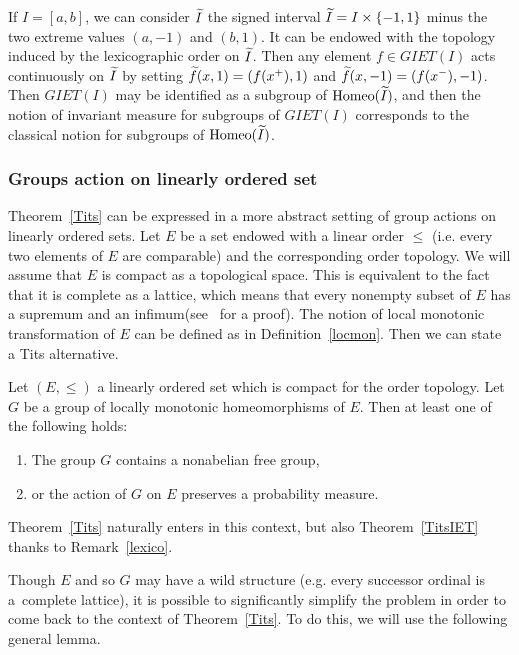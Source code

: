 \documentclass[AHL,Unicode,longabstracts,published]{cedram}
\DeclareMathOperator{\Homeo}{Homeo}
\let\oldtilde\tilde
\renewcommand*{\tilde}[1]{\mathchoice{\widetilde{#1}}{\widetilde{#1}}{\oldtilde{#1}}{\oldtilde{#1}}}
\begin{document}
\begin{rema}\label{lexico}
If $I=[a,b]$, we can consider $\tilde{I}$ the signed interval $\tilde{I}=I\times \{-1,1\}$ minus the two extreme values $(a,-1)$ and $(b,1)$. It can be endowed with the topology induced by the lexicographic order on $\tilde{I}$. Then any element $f\in \mathit{GIET}(I)$ acts continuously on $\tilde{I}$ by setting $\tilde{f}(x,1)=(f(x^+),1)$ and $\tilde{f}(x,-1)=(f(x^-),-1)$. Then $\mathit{GIET}(I)$ may be identified as a subgroup of $\Homeo(\tilde{I})$, and then the notion of invariant measure for subgroups of $\mathit{GIET}(I)$ corresponds to the classical notion for subgroups of $\Homeo(\tilde{I})$.
\end{rema}

\subsubsection*{Groups action on linearly ordered set} Theorem~\ref{Tits} can be expressed in a more abstract setting of group actions on linearly ordered sets. Let $E$ be a set endowed with a linear order $\leq$ (i.e. every two elements of $E$ are comparable) and the corresponding order topology. We will assume that $E$ is compact as a topological space. This is equivalent to the fact that it is complete as a lattice, which means that every nonempty subset of $E$ has a supremum and an infimum(see~\cite[Chapitre~III, Theorem~9]{B} for a proof). The notion of local monotonic transformation of $E$ can be defined as in Definition~\ref{locmon}. Then we can state a Tits alternative.

\begin{theo}\label{TitsLinOrd}
Let $(E,\leq)$ a linearly ordered set which is compact for the order topology. Let $G$ be a group of locally monotonic homeomorphisms of $E$. Then at least one of the following holds:
\begin{enumerate}
\item\label{theo1.13.1} The group $G$ contains a nonabelian free group,
\item\label{theo1.13.2} or the action of $G$ on $E$ preserves a probability measure.
\end{enumerate}
\end{theo}

Theorem~\ref{Tits} naturally enters in this context, but also Theorem~\ref{TitsIET} thanks to Remark~\ref{lexico}.

Though $E$ and so $G$ may have a wild structure (e.g. every successor ordinal is a~complete lattice), it is possible to significantly simplify the problem in order to come back to the context of Theorem~\ref{Tits}. To do this, we will use the following general lemma.
\end{document}
